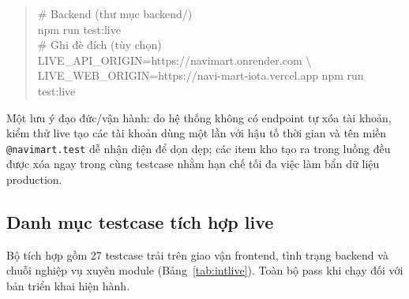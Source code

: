 \documentclass[12pt,a4paper]{article}
\newcommand{\code}[1]{\texttt{#1}}
\begin{document}
\begin{quote}\ttfamily\small
\# Backend (thư mục backend/)\\
npm run test:live\\[2pt]
\# Ghi đè đích (tùy chọn)\\
LIVE\_API\_ORIGIN=https://navimart.onrender.com \textbackslash\\
LIVE\_WEB\_ORIGIN=https://navi-mart-iota.vercel.app npm run test:live
\end{quote}

Một lưu ý đạo đức/vận hành: do hệ thống không có endpoint tự xóa tài khoản, kiểm thử live tạo các tài khoản
dùng một lần với hậu tố thời gian và tên miền \code{@navimart.test} dễ nhận diện để dọn dẹp; các item kho tạo
ra trong luồng đều được xóa ngay trong cùng testcase nhằm hạn chế tối đa việc làm bẩn dữ liệu production.

\subsection{Danh mục testcase tích hợp live}

Bộ tích hợp gồm 27 testcase trải trên giao vận frontend, tình trạng backend và chuỗi nghiệp vụ xuyên module
(Bảng~\ref{tab:intlive}). Toàn bộ pass khi chạy đối với bản triển khai hiện hành.
\end{document}
